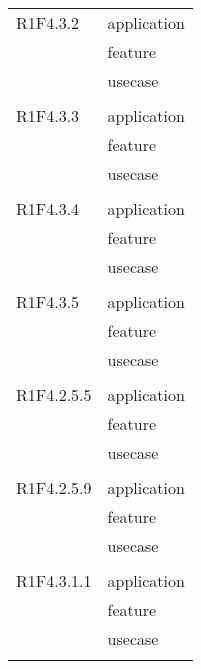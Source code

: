 \begin{center}
\begin{longtable}{|p{7cm}|p{5cm}|}
		R1F4.3.2 & application \\ & feature \\ & usecase \\ & \\ \hline
		R1F4.3.3 & application \\ & feature \\ & usecase \\ & \\ \hline
		R1F4.3.4 & application \\ & feature \\ & usecase \\ & \\ \hline
		R1F4.3.5 & application \\ & feature \\ & usecase \\ & \\ \hline
		R1F4.2.5.5 & application \\ & feature \\ & usecase \\ & \\ \hline
		R1F4.2.5.9 & application \\ & feature \\ & usecase \\ & \\ \hline
		R1F4.3.1.1 & application \\ & feature \\ & usecase \\ & \\ \hline
	\end{longtable}
\end{center}
